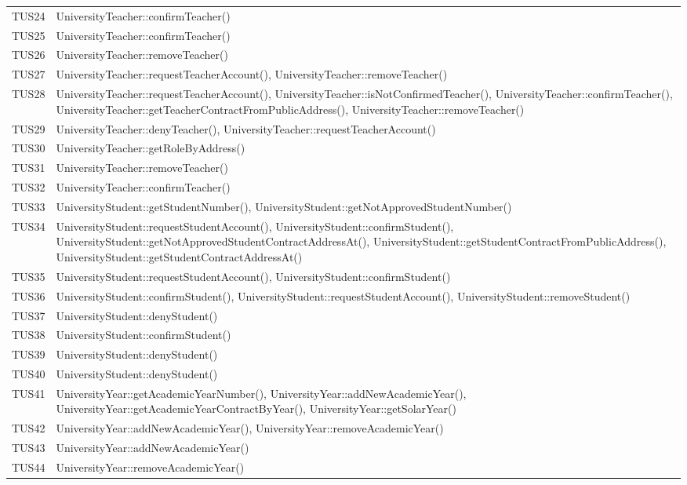 \documentclass[PianoDiQualifica.tex]{subfiles}
\begin{document}
\begin{longtable}[H]{P{5cm}P{9cm}}
	TUS24 & UniversityTeacher::confirmTeacher() \\
	TUS25 & UniversityTeacher::confirmTeacher() \\
	TUS26 & UniversityTeacher::removeTeacher() \\
	TUS27 & UniversityTeacher::requestTeacherAccount(), UniversityTeacher::removeTeacher() \\
	TUS28 & UniversityTeacher::requestTeacherAccount(), UniversityTeacher::isNotConfirmedTeacher(), UniversityTeacher::confirmTeacher(), UniversityTeacher::getTeacherContractFromPublicAddress(), UniversityTeacher::removeTeacher() \\
	TUS29 & UniversityTeacher::denyTeacher(), UniversityTeacher::requestTeacherAccount() \\
	TUS30 & UniversityTeacher::getRoleByAddress() \\
	TUS31 & UniversityTeacher::removeTeacher() \\
	TUS32 & UniversityTeacher::confirmTeacher() \\
	TUS33 & UniversityStudent::getStudentNumber(), UniversityStudent::getNotApprovedStudentNumber() \\
	TUS34 & UniversityStudent::requestStudentAccount(), UniversityStudent::confirmStudent(), UniversityStudent::getNotApprovedStudentContractAddressAt(), UniversityStudent::getStudentContractFromPublicAddress(), UniversityStudent::getStudentContractAddressAt()
	\\
	TUS35 & UniversityStudent::requestStudentAccount(), UniversityStudent::confirmStudent()  \\
	TUS36 & UniversityStudent::confirmStudent(), UniversityStudent::requestStudentAccount(), UniversityStudent::removeStudent()  \\
	TUS37 & UniversityStudent::denyStudent() \\
	TUS38 & UniversityStudent::confirmStudent() \\
	TUS39 & UniversityStudent::denyStudent() \\
	TUS40 & UniversityStudent::denyStudent() \\
	TUS41 & UniversityYear::getAcademicYearNumber(), UniversityYear::addNewAcademicYear(), UniversityYear::getAcademicYearContractByYear(), UniversityYear::getSolarYear()\\
	TUS42 & UniversityYear::addNewAcademicYear(), UniversityYear::removeAcademicYear() \\
	TUS43 & UniversityYear::addNewAcademicYear()\\
	TUS44 & UniversityYear::removeAcademicYear()\\

\end{longtable}
\end{document}
